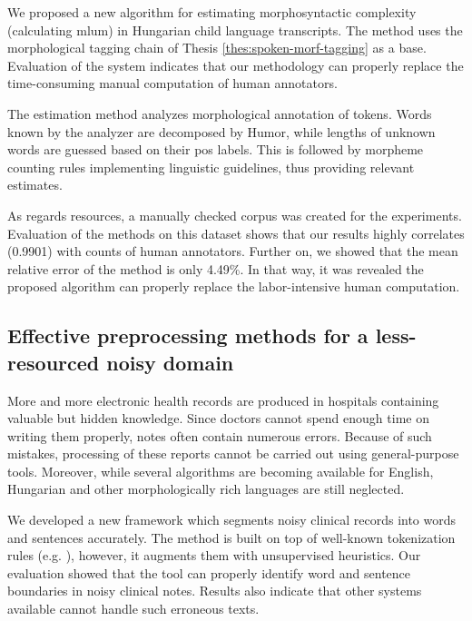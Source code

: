 \begin{core}
\begin{thesis}
\label{thes:mlu-estimation}
We proposed a new algorithm for estimating morphosyntactic complexity (calculating \acrlong{mlum}) in Hungarian child language transcripts.
The method uses the morphological tagging chain of Thesis \ref{thes:spoken-morf-tagging} as a base.
Evaluation of the system indicates that our methodology can properly replace the time-consuming manual computation of human annotators.
\end{thesis}

\begin{pub}
\cite{Matyus2014,Orosz2014c}
\end{pub}
\end{core}

The estimation method analyzes morphological annotation of tokens.
Words known by the analyzer are decomposed by Humor, while lengths of unknown words are guessed based on their \acrshort{pos} labels.
This is followed by morpheme counting rules implementing linguistic guidelines, thus providing relevant estimates.

As regards resources, a manually checked corpus was created for the experiments.
Evaluation of the methods on this dataset shows that our results highly correlates (0.9901) with counts of human annotators.
Further on, we showed that the mean relative error of the method is only 4.49\%.
In that way, it was revealed the proposed algorithm can properly replace the labor-intensive human computation.

\subsection{Effective preprocessing methods for a less-resourced noisy domain}
\label{thes:clin}

More and more electronic health records are produced in hospitals containing valuable but hidden knowledge.
Since doctors cannot spend enough time on writing them properly, notes often contain numerous errors.
Because of such mistakes, processing of these reports cannot be carried out using general-purpose tools.
Moreover, while several algorithms are becoming available for English, Hungarian and other morphologically rich languages are still neglected.

\begin{core}
\begin{thesis}%
\label{thes:clin-segment}
We developed a new framework which segments noisy clinical records into words and sentences accurately.
The method is built on top of well-known tokenization rules (e.g. \cite{Halacsy2004}), however, it augments them with unsupervised heuristics.
Our evaluation showed that the tool can properly identify word and sentence boundaries in noisy clinical notes. 
Results also indicate that other systems available cannot handle such erroneous texts.
\end{thesis}

\begin{pub}
\cite{Orosz2013d, Orosz2014a}
\end{pub}
\end{core}

